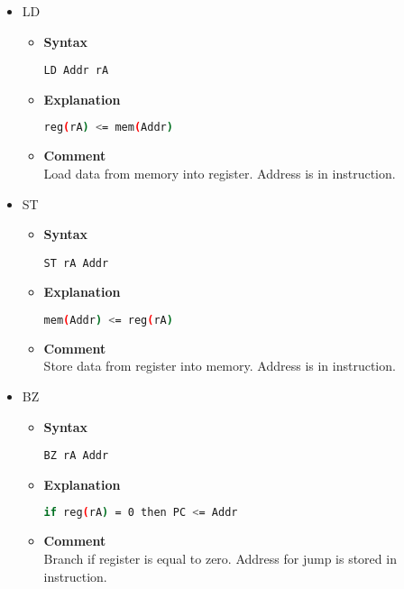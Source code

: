\begin{itemize}
    \item LD
    \begin{itemize}
        \item \textbf{Syntax}
        \begin{lstlisting}[language={[x86masm]Assembler}, frame=single]
    LD Addr rA
        \end{lstlisting}
        \item \textbf{Explanation}
        \begin{lstlisting}[language=bash, frame=single]
    reg(rA) <= mem(Addr)
        \end{lstlisting}
        \item \textbf{Comment} \\
    Load data from memory into register. Address is in instruction.
    \end{itemize}

    \item ST
    \begin{itemize}
        \item \textbf{Syntax}
        \begin{lstlisting}[language={[x86masm]Assembler}, frame=single]
    ST rA Addr
        \end{lstlisting}
        \item \textbf{Explanation}
        \begin{lstlisting}[language=bash, frame=single]
    mem(Addr) <= reg(rA)
        \end{lstlisting}
        \item \textbf{Comment} \\
    Store data from register into memory. Address is in instruction.
    \end{itemize}

    \item BZ
    \begin{itemize}
        \item \textbf{Syntax}
        \begin{lstlisting}[language={[x86masm]Assembler}, frame=single]
    BZ rA Addr
        \end{lstlisting}
        \item \textbf{Explanation}
        \begin{lstlisting}[language=bash, frame=single]
    if reg(rA) = 0 then PC <= Addr
        \end{lstlisting}
        \item \textbf{Comment} \\
    Branch if register is equal to zero. Address for jump is stored in instruction.
    \end{itemize}


\end{itemize}
